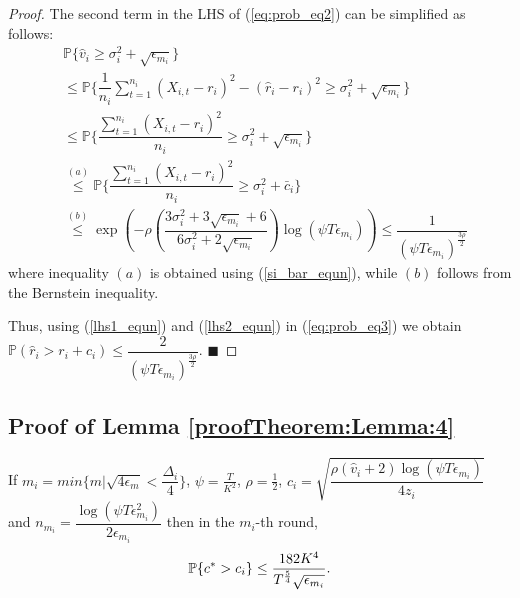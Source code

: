 \begin{proof}
 
The second term in the LHS of (\ref{eq:prob_eq2}) can be simplified as follows:
\begin{align}
&\mathbb{P}\bigg\lbrace \hat{v}_{i}\geq \sigma_{i}^{2}+\sqrt{\epsilon_{m_{i}}}\bigg\rbrace\nonumber\\
&\leq \mathbb{P}\bigg\lbrace \dfrac{1}{n_{i}}\sum_{t=1}^{n_{i}}(X_{i,t}-r_{i})^{2}-(\hat{r}_{i}-r_{i})^{2}\geq \sigma_{i}^{2}+\sqrt{\epsilon_{m_{i}}}\bigg\rbrace\nonumber\\
&\leq \mathbb{P}\bigg\lbrace \dfrac{\sum_{t=1}^{n_{i}}(X_{i,t}-r_{i})^{2}}{n_{i}}\geq \sigma_{i}^{2}+\sqrt{\epsilon_{m_{i}}} \bigg\rbrace\nonumber\\
&\overset{(a)}{\leq} \mathbb{P}\bigg\lbrace \dfrac{\sum_{t=1}^{n_{i}}(X_{i,t}-r_{i})^{2}}{n_{i}}\geq \sigma_{i}^{2} + \bar{c}_i\bigg\rbrace \nonumber\\
&\overset{(b)}{\leq} \exp\left(- \rho \left(\dfrac{3\sigma_{i}^{2}+3\sqrt{\epsilon_{m_{i}}} + 6}{6\sigma_i^2 + 2\sqrt{\epsilon_{m_i}}} \right)\log(\psi  T\epsilon_{m_{i}})\right)
\le \dfrac{1}{(\psi  T\epsilon_{m_{i}})^{\frac{3\rho}{2}}}
\label{lhs2_equn}
\end{align}
where inequality $(a)$ is obtained using (\ref{si_bar_equn}), while $(b)$ follows from the Bernstein inequality. 

Thus, using (\ref{lhs1_equn}) and (\ref{lhs2_equn}) in (\ref{eq:prob_eq3}) we obtain $\mathbb{P}(\hat{r}_{i}> r_{i} + c_{i})\le \dfrac{2}{(\psi  T\epsilon_{m_{i}})^{\frac{3\rho}{2}}}$.
\hfill $\blacksquare$	
\end{proof}


\subsection{Proof of Lemma \ref{proofTheorem:Lemma:4}}
\label{App:Lemma:4}
\begin{customlem}{4}
If $m_i = min\lbrace m|\sqrt{4\epsilon_{m} } < \dfrac{\Delta_i}{4} \rbrace $, $\psi=\frac{T}{ K^2}$, $\rho=\frac{1}{2}$,  $c_{i} =\sqrt{\dfrac{\rho(\hat{v}_i + 2)\log (\psi T\epsilon_{m_{i}})}{4 z_{i}}}$ and $n_{m_i}=\dfrac{\log{(\psi T\epsilon_{m_{i}}^{2})}}{2\epsilon_{m_{i}}}$ then in the $m_i$-th round, 
\begin{align*}
\mathbb{P}\lbrace c^{*} > c_i \rbrace  \leq \dfrac{182 K^4}{T^{\frac{5}{4}}\sqrt{\epsilon_{m_i}}}.
\end{align*}
\end{customlem}

